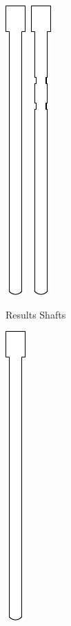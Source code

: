 \documentclass[openany]{book}
\begin{document}
\begin{figure}[!ht]
\begin{subfigure}{.4\textwidth}
		\includegraphics[width=.05\textwidth]{images/transmission-shaft.pdf}\,
		\includegraphics[width=.05\textwidth]{images/transmission-result-one.pdf}
		\caption{Results Shafts}
	\end{subfigure}
	\begin{subfigure}{.4\textwidth}
		\centering
    		\includegraphics[width=.05\textwidth]{images/transmission-shaft.pdf}\,

\end{subfigure}
\end{figure}
\end{document}
